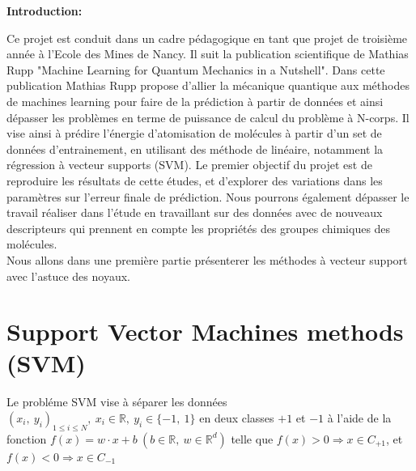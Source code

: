 \documentclass[a4paper,12pt,titlepage]{report}
\begin{document}
\tableofcontents

\newpage



\textbf{\Huge Introduction:} \\
\newline

Ce projet est conduit dans un cadre pédagogique en tant que projet de troisième année à l'Ecole des Mines de Nancy. Il suit la publication scientifique de Mathias Rupp "Machine Learning for Quantum Mechanics in a Nutshell". Dans cette publication Mathias Rupp propose d'allier la mécanique quantique aux méthodes de machines learning pour faire de la prédiction à partir de données et ainsi dépasser les problèmes en terme de puissance de calcul du problème à N-corps. Il vise ainsi à prédire l'énergie d'atomisation de molécules à partir d'un set de données d'entrainement, en utilisant des méthode de  linéaire, notamment la régression à vecteur supports (SVM). 
Le premier objectif du projet est de reproduire les résultats de cette études, et d'explorer des variations dans les paramètres sur l'erreur finale de prédiction. Nous pourrons également dépasser le travail réaliser dans l'étude en travaillant sur des données avec de nouveaux descripteurs qui prennent en compte les propriétés des groupes chimiques des molécules.\\
Nous allons dans une première partie présenterer les méthodes à vecteur support avec l'astuce des noyaux.

\chapter{Support Vector Machines methods (SVM)}

Le probléme SVM vise à séparer les données $(x_{i},\ y_{i})_{1 \leqslant i \leqslant N},\ x_{i} \in \mathbb{R}, \ y_{i} \in \{-1,\ 1\}$ en deux classes $+1$ et $-1$ à l'aide de la fonction $f(x) = w \cdot x + b \ (b \in \mathbb{R},\ w \in  \mathbb{R}^{d})$ telle que $f(x) > 0 \Rightarrow x \in C_{+1}$, et $f(x) < 0 \Rightarrow x \in C_{-1}$
\end{document}
